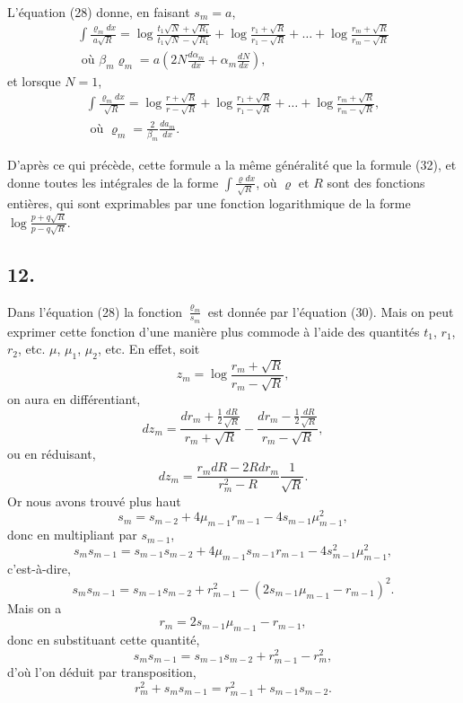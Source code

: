\documentclass[oneside, 12 pt, leqno]{memoir}
\begin{document}
L'équation (28) donne, en faisant \(s_m=a\),
\begin{gather*}
\tag{32}\int \frac{\varrho_m d x}{a \sqrt{R}}=\log \frac{t_1 \sqrt{N}+\sqrt{R_1}}{t_1 \sqrt{N}-\sqrt{R_1}}+\log \frac{r_1+\sqrt{R}}{r_1-\sqrt{R}}+\dots+\log \frac{r_m+\sqrt{R}}{r_m-\sqrt{R}} \\
\text { où } \beta_m \varrho_m=a\left(2 N \frac{d \alpha_m}{d x}+\alpha_m \frac{d N}{d x}\right),
\end{gather*}
et lorsque \(N=1\),
\begin{gather*}
\tag{33} \int \frac{\varrho_m d x}{\sqrt{R}}=\log \frac{r+\sqrt{R}}{r-\sqrt{R}}+\log \frac{r_1+\sqrt{R}}{r_1-\sqrt{R}}+\dots+\log \frac{r_m+\sqrt{R}}{r_m-\sqrt{R}}, \\
\text { où } \varrho_m=\frac{2}{\beta_m} \frac{d a_m}{d x}.
\end{gather*}

D'après ce qui précède, cette formule a la même généralité que la formule (32), et donne toutes les intégrales de la forme \(\int \frac{\varrho d x}{\sqrt{R}}\), où \(\varrho\) et \(R\) sont des fonctions entières, qui sont exprimables par une fonction logarithmique de la forme \(\log \frac{p+q \sqrt{R}}{p-q \sqrt{R}}\).

\subsection*{12.}

Dans l'équation (28) la fonction \(\frac{\varrho_m}{s_m}\) est donnée par l'équation (30). Mais on peut exprimer cette fonction d'une manière plus commode à l'aide des quantités \(t_1\), \(r_1\), \(r_2\), etc. \(\mu\), \(\mu_1\), \(\mu_2\), etc. En effet, soit
\[z_m=\log \frac{r_m+\sqrt{R}}{r_m-\sqrt{R}},\]
on aura en différentiant,
\[d z_m=\frac{d r_m+\frac{1}{2} \frac{d R}{\sqrt{R}}}{r_m+\sqrt{R}}-\frac{d r_m-\frac{1}{2} \frac{d R}{\sqrt{R}}}{r_m-\sqrt{R}},\]
ou en réduisant,
\[\tag{33'}d z_m=\frac{r_m d R-2 R d r_m}{r_m^2-R} \frac{1}{\sqrt{R}}.\]
Or nous avons trouvé plus haut
\[s_m=s_{m-2}+4 \mu_{m-1} r_{m-1}-4 s_{m-1} \mu_{m-1}^2,\]
donc en multipliant par \(s_{m-1}\),
\[s_m s_{m-1}=s_{m-1} s_{m-2}+4 \mu_{m-1} s_{m-1} r_{m-1}-4 s_{m-1}^2 \mu_{m-1}^2,\]
c'est-à-dire,
\[s_m s_{m-1}=s_{m-1} s_{m-2}+r_{m-1}^2-\left(2 s_{m-1} \mu_{m-1}-r_{m-1}\right)^2.\]
Mais on a
\[r_m=2 s_{m-1} \mu_{m-1}-r_{m-1},\]
donc en substituant cette quantité,
\[s_m s_{m-1}=s_{m-1} s_{m-2}+r_{m-1}^2-r_m^2,\]
d'où l'on déduit par transposition,
\[r_m^2+s_m s_{m-1}=r_{m-1}^2+s_{m-1} s_{m-2}.\]
\end{document}
